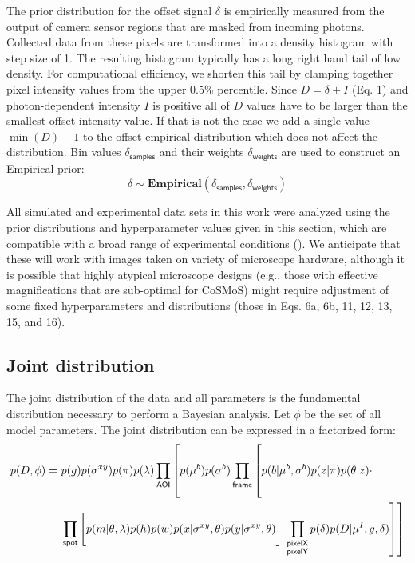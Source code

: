 The prior distribution for the offset signal $\delta$ is empirically measured from the output of camera sensor regions that are masked from incoming photons. Collected data from these pixels are transformed into a density histogram with step size of 1. The resulting histogram typically has a long right hand tail of low density. For computational efficiency, we shorten this tail by clamping together pixel intensity values from the upper 0.5\% percentile. Since $D = \delta + I$ (Eq. 1) and photon-dependent intensity $I$ is positive all of $D$ values have to be larger than the smallest offset intensity value. If that is not the case we add a single value $\min(D) - 1$ to the offset empirical distribution which does not affect the distribution. Bin values $\delta_\mathsf{samples}$ and their weights $\delta_\mathsf{weights}$ are used to construct an Empirical prior:
%
\begin{equation}
    \delta \sim \mathbf{Empirical}(\delta_\mathsf{samples}, \delta_\mathsf{weights})
\end{equation}

All simulated and experimental data sets in this work were analyzed using the prior distributions and hyperparameter values given in this section, which are compatible with a broad range of experimental conditions (). We anticipate that these will work with images taken on variety of microscope hardware, although it is possible that highly atypical microscope designs (e.g., those with effective magnifications that are sub-optimal for CoSMoS) might require adjustment of some fixed hyperparameters and distributions (those in Eqs. 6a, 6b, 11, 12, 13, 15, and 16).

\subsection{Joint distribution}

The joint distribution of the data and all parameters is the fundamental distribution necessary to perform a Bayesian analysis.  Let $\phi$ be the set of all model parameters. The joint distribution can be expressed in a factorized form:
%
\begin{equation}
\begin{aligned}
    p(D, \phi) =~&p(g) p(\sigma^{xy}) p(\pi) p(\lambda) \prod_{\mathsf{AOI}} \left[ p(\mu^b) p(\sigma^b) \prod_{\mathsf{frame}} \left[ \vphantom{\prod_{F}} p(b | \mu^b, \sigma^b) p(z | \pi) p(\theta | z) \vphantom{\prod_{\substack{\mathsf{pixelX} \\ \mathsf{pixelY}}}} \cdot \right. \right. \\
    &\prod_{\mathsf{spot}} \left[ \vphantom{\prod_{F}} p(m | \theta, \lambda) p(h) p(w) p(x | \sigma^{xy}, \theta) p(y | \sigma^{xy}, \theta) \right] \left. \left. \prod_{\substack{\mathsf{pixelX} \\ \mathsf{pixelY}}} p(\delta) p(D | \mu^I, g, \delta) \right] \right]
\end{aligned}
\end{equation}

